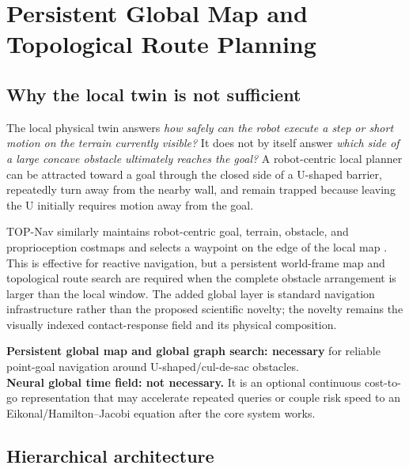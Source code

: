 \section{Persistent Global Map and Topological Route Planning}
\label{sec:global}

\subsection{Why the local twin is not sufficient}

The local physical twin answers \emph{how safely can the robot execute a step or short motion on the terrain currently visible?} It does not by itself answer \emph{which side of a large concave obstacle ultimately reaches the goal?} A robot-centric local planner can be attracted toward a goal through the closed side of a U-shaped barrier, repeatedly turn away from the nearby wall, and remain trapped because leaving the U initially requires motion away from the goal.

TOP-Nav similarly maintains robot-centric goal, terrain, obstacle, and proprioception costmaps and selects a waypoint on the edge of the local map \citep{ren2024topnav}. This is effective for reactive navigation, but a persistent world-frame map and topological route search are required when the complete obstacle arrangement is larger than the local window. The added global layer is standard navigation infrastructure rather than the proposed scientific novelty; the novelty remains the visually indexed contact-response field and its physical composition.

\begin{claimbox}
\textbf{Persistent global map and global graph search: necessary} for reliable point-goal navigation around U-shaped/cul-de-sac obstacles.\\
\textbf{Neural global time field: not necessary.} It is an optional continuous cost-to-go representation that may accelerate repeated queries or couple risk speed to an Eikonal/Hamilton--Jacobi equation after the core system works.
\end{claimbox}

\subsection{Hierarchical architecture}

